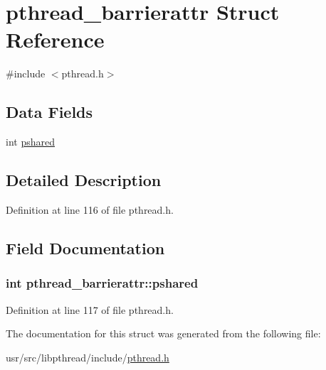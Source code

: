 \hypertarget{structpthread__barrierattr}{\section{pthread\+\_\+barrierattr Struct Reference}
\label{structpthread__barrierattr}
}


{\ttfamily \#include $<$pthread.\+h$>$}

\subsection*{Data Fields}
\begin{DoxyCompactItemize}
\item 
int \hyperlink{structpthread__barrierattr_a50ef34671e6743cc59c895dd878c4a86}{pshared}
\end{DoxyCompactItemize}


\subsection{Detailed Description}


Definition at line 116 of file pthread.\+h.



\subsection{Field Documentation}
\hypertarget{structpthread__barrierattr_a50ef34671e6743cc59c895dd878c4a86}{
\subsubsection[{pshared}]{\setlength{\rightskip}{0pt plus 5cm}int pthread\+\_\+barrierattr\+::pshared}}\label{structpthread__barrierattr_a50ef34671e6743cc59c895dd878c4a86}


Definition at line 117 of file pthread.\+h.



The documentation for this struct was generated from the following file\+:\begin{DoxyCompactItemize}
\item 
usr/src/libpthread/include/\hyperlink{pthread_8h}{pthread.\+h}\end{DoxyCompactItemize}
